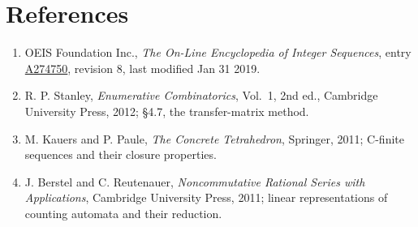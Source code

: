 \documentclass[11pt]{article}
\theoremstyle{definition}
\begin{document}
\section{References}

\begin{enumerate}

\item OEIS Foundation Inc., \emph{The On-Line Encyclopedia of Integer Sequences}, entry \href{https://oeis.org/A274750}{A274750}, revision 8, last modified Jan 31 2019.

\item R. P. Stanley, \emph{Enumerative Combinatorics}, Vol.~1, 2nd ed., Cambridge University Press, 2012; \S4.7, the transfer-matrix method.

\item M. Kauers and P. Paule, \emph{The Concrete Tetrahedron}, Springer, 2011; C-finite sequences and their closure properties.

\item J. Berstel and C. Reutenauer, \emph{Noncommutative Rational Series with Applications}, Cambridge University Press, 2011; linear representations of counting automata and their reduction.

\end{enumerate}
\end{document}
